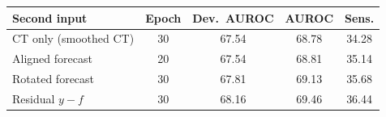 \setlength{\tabcolsep}{4pt}\footnotesize
\begin{tabular}{@{}l S[table-format=2.0] S[table-format=2.2] S[table-format=2.2] S[table-format=2.2]@{}}
\toprule
Second input & {Epoch} & {Dev.\ AUROC} & {AUROC} & {Sens.} \\
\midrule
CT only (smoothed CT) & 30 & 67.54 & 68.78 & 34.28 \\
Aligned forecast & 20 & 67.54 & 68.81 & 35.14 \\
Rotated forecast & 30 & 67.81 & 69.13 & 35.68 \\
Residual $y-f$ & 30 & 68.16 & 69.46 & 36.44 \\
\bottomrule
\end{tabular}
